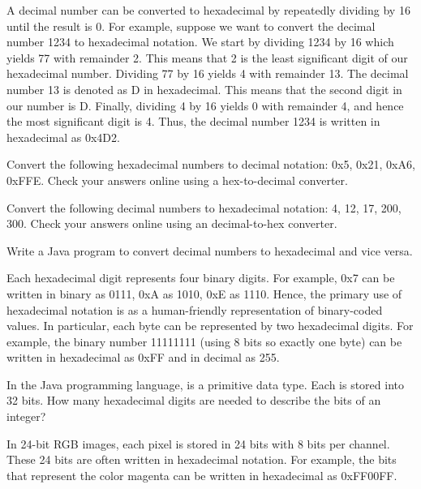 \documentclass{book}
\begin{document}
A decimal number can be converted to hexadecimal by repeatedly dividing by 16 until the result is 0. For example, suppose we want to convert the decimal number 1234 to hexadecimal notation. We start by dividing 1234 by 16 which yields 77 with remainder 2. This means that 2 is the least significant digit of our hexadecimal number. Dividing 77 by 16 yields 4 with remainder 13. The decimal number 13 is denoted as D in hexadecimal. This means that the second digit in our number is D. Finally, dividing 4 by 16 yields 0 with remainder 4, and hence the most significant digit is 4. Thus, the decimal number 1234 is written in hexadecimal as 0x4D2.

\begin{exercise}
Convert the following hexadecimal numbers to decimal notation: 0x5, 0x21, 0xA6, 0xFFE. Check your answers online using a hex-to-decimal converter.
\end{exercise}

\begin{exercise}
Convert the following decimal numbers to hexadecimal notation: 4, 12, 17, 200, 300. Check your answers online using an decimal-to-hex converter.
\end{exercise}

\begin{exercise}
Write a Java program to convert decimal numbers to hexadecimal and vice versa.
\end{exercise}

Each hexadecimal digit represents four binary digits. For example, 0x7 can be written in binary as 0111, 0xA as 1010, 0xE as 1110. Hence, the primary use of hexadecimal notation is as a human-friendly representation of binary-coded values. In particular, each byte can be represented by two hexadecimal digits. For example, the binary number 11111111 (using 8 bits so exactly one byte) can be written in hexadecimal as 0xFF and in decimal as 255.

\begin{exercise}
In the Java programming language,   is a primitive data type. Each  is stored into 32 bits. How many hexadecimal digits are needed to describe the bits of an integer?
\end{exercise}

In 24-bit RGB images, each pixel is stored in 24 bits with 8 bits per channel. These 24 bits are often written in hexadecimal notation. For example, the bits that represent the color magenta can be written in hexadecimal as 0xFF00FF. 
\end{document}
